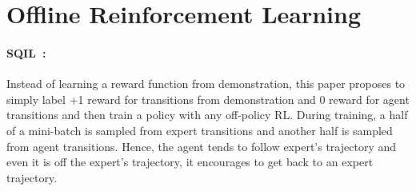 \section{Offline Reinforcement Learning}

\paragraph{SQIL~\citep{reddy2020sqil}:} 
Instead of learning a reward function from demonstration, this paper proposes to simply label +1 reward for transitions from demonstration and 0 reward for agent transitions and then train a policy with any off-policy RL. During training, a half of a mini-batch is sampled from expert transitions and another half is sampled from agent transitions. Hence, the agent tends to follow expert's trajectory and even it is off the expert's trajectory, it encourages to get back to an expert trajectory.